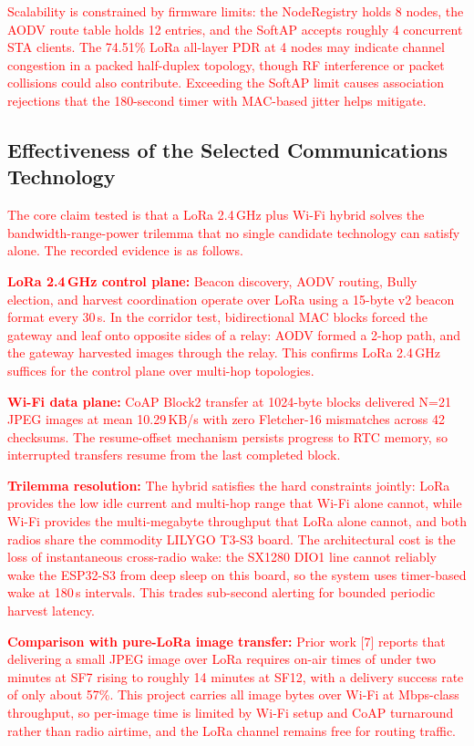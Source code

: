 \documentclass[12pt,a4paper]{article}
\DeclareRobustCommand{\changed}[1]{\textcolor{red}{#1}}
\begin{document}
\changed{Scalability is constrained by firmware limits: the NodeRegistry holds 8 nodes, the AODV route table holds 12 entries, and the SoftAP accepts roughly 4 concurrent STA clients. The 74.51\% LoRa all-layer PDR at 4 nodes may indicate channel congestion in a packed half-duplex topology, though RF interference or packet collisions could also contribute. Exceeding the SoftAP limit causes association rejections that the 180-second timer with MAC-based jitter helps mitigate.}

\subsection{Effectiveness of the Selected Communications Technology}
\label{sec:effectiveness}

\changed{The core claim tested is that a LoRa 2.4\,GHz plus Wi-Fi hybrid solves the bandwidth-range-power trilemma that no single candidate technology can satisfy alone. The recorded evidence is as follows.}

\changed{\textbf{LoRa 2.4\,GHz control plane:} Beacon discovery, AODV routing, Bully election, and harvest coordination operate over LoRa using a 15-byte v2 beacon format every 30\,s. In the corridor test, bidirectional MAC blocks forced the gateway and leaf onto opposite sides of a relay: AODV formed a 2-hop path, and the gateway harvested images through the relay. This confirms LoRa 2.4\,GHz suffices for the control plane over multi-hop topologies.}

\changed{\textbf{Wi-Fi data plane:} CoAP Block2 transfer at 1024-byte blocks delivered N=21 JPEG images at mean 10.29\,KB/s with zero Fletcher-16 mismatches across 42 checksums. The resume-offset mechanism persists progress to RTC memory, so interrupted transfers resume from the last completed block.}

\changed{\textbf{Trilemma resolution:} The hybrid satisfies the hard constraints jointly: LoRa provides the low idle current and multi-hop range that Wi-Fi alone cannot, while Wi-Fi provides the multi-megabyte throughput that LoRa alone cannot, and both radios share the commodity LILYGO T3-S3 board. The architectural cost is the loss of instantaneous cross-radio wake: the SX1280 DIO1 line cannot reliably wake the ESP32-S3 from deep sleep on this board, so the system uses timer-based wake at 180\,s intervals. This trades sub-second alerting for bounded periodic harvest latency.}

\changed{\textbf{Comparison with pure-LoRa image transfer:} Prior work [7] reports that delivering a small JPEG image over LoRa requires on-air times of under two minutes at SF7 rising to roughly 14 minutes at SF12, with a delivery success rate of only about 57\%. This project carries all image bytes over Wi-Fi at Mbps-class throughput, so per-image time is limited by Wi-Fi setup and CoAP turnaround rather than radio airtime, and the LoRa channel remains free for routing traffic.}
\end{document}
